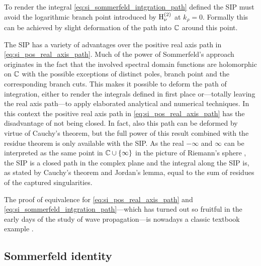 \begin{remark}
	To render the integral \eqref{eq:si_sommerfeld_intgration_path} defined
	the \ac{SIP} must avoid the logarithmic branch point introduced by
	$\operatorname{H}_{\nu}^{\left( 2 \right)}$ at $k_\rho = 0$.
	Formally this can be achieved by slight deformation of the path into
	$\mathbb{C}$ around this point.
\end{remark}

The \ac{SIP} has a variety of advantages over the positive real axis path in
\eqref{eq:si_pos_real_axis_path}.
Much of the power of Sommerfeld's approach originates in the fact that the
involved spectral domain functions are holomorphic on $\mathbb{C}$ with the possible
exceptions of distinct poles, branch point and the corresponding branch cuts.
This makes it possible to deform the path of integration, either to render
the integrals defined in first place or---totally leaving the real axis
path---to apply elaborated analytical and numerical techniques.
In this context the positive real axis path in \eqref{eq:si_pos_real_axis_path}
has the disadvantage of not being closed.
In fact, also this path can be deformed by virtue of Cauchy's theorem, but
the full power of this result combined with the residue theorem is only
available with the \ac{SIP}.
As the real $-\infty$ and $\infty$ can be interpreted as the same point in
$\mathbb{C} \cup \left\{\infty\right\}$ in the picture of Riemann's sphere
\cite[p.~180]{Meyberg2006}, the \ac{SIP} is a closed path in the complex plane
and the integral along the \ac{SIP} is, as stated by Cauchy's theorem
and Jordan's lemma, equal to the sum of residues of the captured singularities.

The proof of equivalence for \eqref{eq:si_pos_real_axis_path} and
\eqref{eq:si_sommerfeld_intgration_path}---which has turned out so fruitful in
the early days of the study of wave propagation---is nowadays a classic textbook
example \cite[p.~203]{Sommerfeld1964}.







\subsection{Sommerfeld identity}


